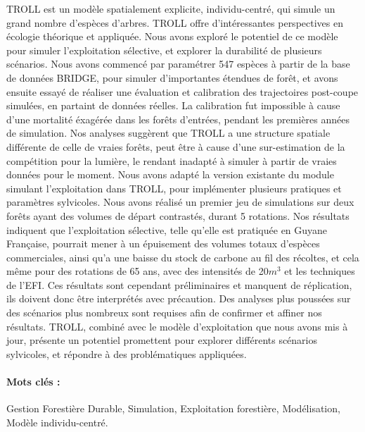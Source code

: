 \documentclass[12pt,]{article}
\theoremstyle{definition}
\theoremstyle{definition}
\theoremstyle{definition}
\theoremstyle{remark}
\begin{document}
{  TROLL est un modèle spatialement explicite, individu-centré, qui simule un grand nombre d'espèces d'arbres. TROLL offre d'intéressantes perspectives en écologie théorique et appliquée. Nous avons exploré le potentiel de ce modèle pour simuler l'exploitation sélective, et explorer la durabilité de plusieurs scénarios.  Nous avons commencé par paramétrer 547 espèces à partir de la base de données BRIDGE, pour simuler d'importantes étendues de forêt, et avons ensuite essayé de réaliser une évaluation et calibration des trajectoires post-coupe simulées, en partaint de données réelles. La calibration fut impossible à cause d'une mortalité éxagérée dans les forêts d'entrées, pendant les premières années de simulation. Nos analyses suggèrent que TROLL a une structure spatiale différente de celle de vraies forêts, peut être à cause d'une sur-estimation de la compétition pour la lumière, le rendant inadapté à simuler à partir de vraies données pour le moment. Nous avons adapté la version existante du module simulant l'exploitation dans TROLL, pour implémenter plusieurs pratiques et paramètres sylvicoles. Nous avons réalisé un premier jeu de simulations sur deux forêts ayant des volumes de départ contrastés, durant 5 rotations. Nos résultats indiquent que l'exploitation sélective, telle qu'elle est pratiquée en Guyane Française, pourrait mener à un épuisement des volumes totaux d'espèces commerciales, ainsi qu'a une baisse du stock de carbone au fil des récoltes, et cela même pour des rotations de 65 ans, avec des intensités de 20$m^3$ et les techniques de l'EFI. Ces résultats sont cependant préliminaires et manquent de réplication, ils doivent donc être interprétés avec précaution. Des analyses plus poussées sur des scénarios plus nombreux sont requises afin de confirmer et affiner nos résultats. TROLL, combiné avec le modèle d'exploitation que nous avons mis à jour, présente un potentiel promettent pour explorer différents scénarios sylvicoles, et répondre à des problématiques appliquées.
  \paragraph{Mots clés :} Gestion Forestière Durable, Simulation, Exploitation forestière, Modélisation, Modèle individu-centré.
}
\end{document}
